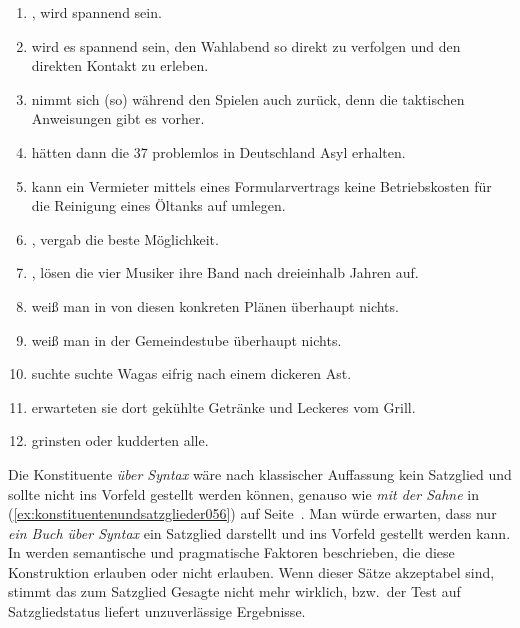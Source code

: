 \begin{enumerate}
  \item {}, wird spannend sein.
  \item \VfTest {} wird es spannend sein, den Wahlabend so direkt zu verfolgen und den direkten Kontakt zu erleben.
  \item \VfTest [Er] nimmt sich (so) während den Spielen auch zurück, denn die taktischen Anweisungen gibt es vorher.
  \item {} hätten dann die 37 problemlos in Deutschland Asyl erhalten.
  \item \VfTest {} kann ein Vermieter mittels eines Formularvertrags keine Betriebskosten für die Reinigung eines Öltanks auf umlegen.
  \item {}, vergab die beste Möglichkeit.
  \item {}, lösen die vier Musiker ihre Band nach dreieinhalb Jahren auf.
  \item \VfTest {} weiß man in von diesen konkreten Plänen überhaupt nichts.
  \item {} weiß man in der Gemeindestube überhaupt nichts.
  \item \VfTest [Um zu helfen] suchte suchte Wagas eifrig nach einem dickeren Ast.
  \item {} erwarteten sie dort gekühlte Getränke und Leckeres vom Grill.
  \item {} grinsten oder kudderten alle.
\end{enumerate}

\label{sol:konstituentenstruktur03}

Die Konstituente \textit{über Syntax} wäre nach klassischer Auffassung kein Satzglied und sollte nicht ins Vorfeld gestellt werden können, genauso wie \textit{mit der Sahne} in (\ref{ex:konstituentenundsatzglieder056}) auf Seite~\pageref{ex:konstituentenundsatzglieder056}.
Man würde erwarten, dass nur \textit{ein Buch über Syntax} ein Satzglied darstellt und ins Vorfeld gestellt werden kann.
In \citet{Dekuthy2002} werden semantische und pragmatische Faktoren beschrieben, die diese Konstruktion erlauben oder nicht erlauben.
Wenn dieser Sätze akzeptabel sind, stimmt das zum Satzglied Gesagte nicht mehr wirklich, bzw.\ der Test auf Satzgliedstatus liefert unzuverlässige Ergebnisse.


